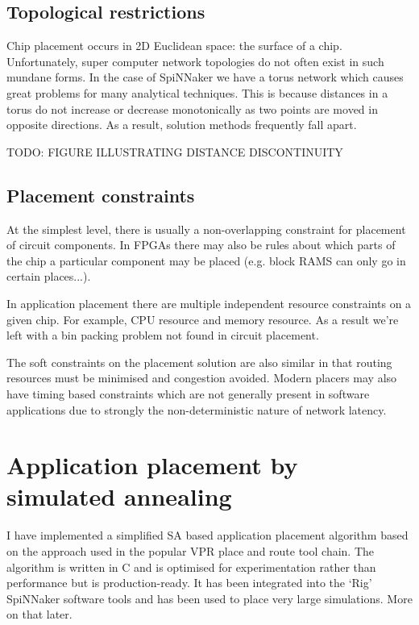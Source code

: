 		\subsection{Topological restrictions}
			
			Chip placement occurs in 2D Euclidean space: the surface of a chip.
			Unfortunately, super computer network topologies do not often exist in
			such mundane forms. In the case of SpiNNaker we have a torus network
			which causes great problems for many analytical techniques. This is
			because distances in a torus do not increase or decrease monotonically as
			two points are moved in opposite directions. As a result, solution
			methods frequently fall apart.
			
			TODO: FIGURE ILLUSTRATING DISTANCE DISCONTINUITY
		
		\subsection{Placement constraints}
			
			At the simplest level, there is usually a non-overlapping constraint for
			placement of circuit components. In FPGAs there may also be rules about
			which parts of the chip a particular component may be placed (e.g. block
			RAMS can only go in certain places...).
			
			In application placement there are multiple independent resource
			constraints on a given chip. For example, CPU resource and memory
			resource. As a result we're left with a bin packing problem not found in
			circuit placement.
			
			The soft constraints on the placement solution are also similar in that
			routing resources must be minimised and congestion avoided. Modern
			placers may also have timing based constraints which are not generally
			present in software applications due to strongly the non-deterministic
			nature of network latency.
	
	\section{Application placement by simulated annealing}
		
		I have implemented a simplified SA based application placement algorithm
		based on the approach used in the popular VPR place and route tool chain.
		The algorithm is written in C and is optimised for experimentation rather
		than performance but is production-ready. It has been integrated into the
		`Rig' SpiNNaker software tools and has been used to place very large
		simulations. More on that later.
		
